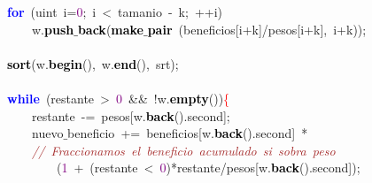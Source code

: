 \mbox{}\ \ \ \ \ \ \ \ \ \ \ \ \textbf{\textcolor{Blue}{for}}\ \textcolor{BrickRed}{(}\textcolor{TealBlue}{uint}\ i\textcolor{BrickRed}{=}\textcolor{Purple}{0}\textcolor{BrickRed}{;}\ i\ \textcolor{BrickRed}{\textless{}}\ tamanio\ \textcolor{BrickRed}{-}\ k\textcolor{BrickRed}{;}\ \textcolor{BrickRed}{++}i\textcolor{BrickRed}{)} \\
\mbox{}\ \ \ \ \ \ \ \ \ \ \ \ \ \ \ \ w\textcolor{BrickRed}{.}\textbf{\textcolor{Black}{push$\_$back}}\textcolor{BrickRed}{(}\textbf{\textcolor{Black}{make$\_$pair}}\ \textcolor{BrickRed}{(}beneficios\textcolor{BrickRed}{[}i\textcolor{BrickRed}{+}k\textcolor{BrickRed}{]/}pesos\textcolor{BrickRed}{[}i\textcolor{BrickRed}{+}k\textcolor{BrickRed}{],}\ i\textcolor{BrickRed}{+}k\textcolor{BrickRed}{));} \\
\mbox{}\ \ \ \ \ \ \ \ \ \ \ \  \\
\mbox{}\ \ \ \ \ \ \ \ \ \ \ \ \textbf{\textcolor{Black}{sort}}\textcolor{BrickRed}{(}w\textcolor{BrickRed}{.}\textbf{\textcolor{Black}{begin}}\textcolor{BrickRed}{(),}\ w\textcolor{BrickRed}{.}\textbf{\textcolor{Black}{end}}\textcolor{BrickRed}{(),}\ srt\textcolor{BrickRed}{);} \\
\mbox{}\ \ \ \ \ \ \ \ \ \ \ \  \\
\mbox{}\ \ \ \ \ \ \ \ \ \ \ \ \textbf{\textcolor{Blue}{while}}\ \textcolor{BrickRed}{(}restante\ \textcolor{BrickRed}{\textgreater{}}\ \textcolor{Purple}{0}\ \textcolor{BrickRed}{\&\&}\ \textcolor{BrickRed}{!}w\textcolor{BrickRed}{.}\textbf{\textcolor{Black}{empty}}\textcolor{BrickRed}{())}\textcolor{Red}{\{} \\
\mbox{}\ \ \ \ \ \ \ \ \ \ \ \ \ \ \ \ restante\ \textcolor{BrickRed}{-=}\ pesos\textcolor{BrickRed}{[}w\textcolor{BrickRed}{.}\textbf{\textcolor{Black}{back}}\textcolor{BrickRed}{().}second\textcolor{BrickRed}{];} \\
\mbox{}\ \ \ \ \ \ \ \ \ \ \ \ \ \ \ \ nuevo$\_$beneficio\ \textcolor{BrickRed}{+=}\ beneficios\textcolor{BrickRed}{[}w\textcolor{BrickRed}{.}\textbf{\textcolor{Black}{back}}\textcolor{BrickRed}{().}second\textcolor{BrickRed}{]}\ \textcolor{BrickRed}{*} \\
\mbox{}\ \ \ \ \ \ \ \ \ \ \ \ \ \ \ \ \textit{\textcolor{Brown}{//\ Fraccionamos\ el\ beneficio\ acumulado\ si\ sobra\ peso}} \\
\mbox{}\ \ \ \ \ \ \ \ \ \ \ \ \ \ \ \ \ \ \ \ \textcolor{BrickRed}{(}\textcolor{Purple}{1}\ \textcolor{BrickRed}{+}\ \textcolor{BrickRed}{(}restante\ \textcolor{BrickRed}{\textless{}}\ \textcolor{Purple}{0}\textcolor{BrickRed}{)*}restante\textcolor{BrickRed}{/}pesos\textcolor{BrickRed}{[}w\textcolor{BrickRed}{.}\textbf{\textcolor{Black}{back}}\textcolor{BrickRed}{().}second\textcolor{BrickRed}{]);} \\
